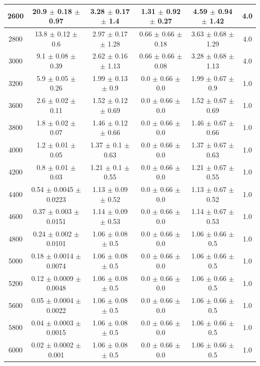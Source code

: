 \begin{table}[htp]
{\begin{tabular}{|c|c|c|c|c|c|}
			2600 & 20.9 $\pm$ 0.18 $\pm$ 0.97 & 3.28 $\pm$ 0.17 $\pm$ 1.4 & 1.31 $\pm$ 0.92 $\pm$ 0.27 & 4.59 $\pm$ 0.94 $\pm$ 1.42 & 4.0     \\ \hline
			2800 & 13.8 $\pm$ 0.12 $\pm$ 0.6 & 2.97 $\pm$ 0.17 $\pm$ 1.28 & 0.66 $\pm$ 0.66 $\pm$ 0.18 & 3.63 $\pm$ 0.68 $\pm$ 1.29 & 4.0     \\ \hline
			3000 & 9.1 $\pm$ 0.08 $\pm$ 0.39 & 2.62 $\pm$ 0.16 $\pm$ 1.13 & 0.66 $\pm$ 0.66 $\pm$ 0.08 & 3.28 $\pm$ 0.68 $\pm$ 1.13 & 4.0     \\ \hline
			3200 & 5.9 $\pm$ 0.05 $\pm$ 0.26 & 1.99 $\pm$ 0.13 $\pm$ 0.9 & 0.0 $\pm$ 0.66 $\pm$ 0.0 & 1.99 $\pm$ 0.67 $\pm$ 0.9 & 1.0     \\ \hline
			3600 & 2.6 $\pm$ 0.02 $\pm$ 0.11 & 1.52 $\pm$ 0.12 $\pm$ 0.69 & 0.0 $\pm$ 0.66 $\pm$ 0.0 & 1.52 $\pm$ 0.67 $\pm$ 0.69 & 1.0     \\ \hline
			3800 & 1.8 $\pm$ 0.02 $\pm$ 0.07 & 1.46 $\pm$ 0.12 $\pm$ 0.66 & 0.0 $\pm$ 0.66 $\pm$ 0.0 & 1.46 $\pm$ 0.67 $\pm$ 0.66 & 1.0     \\ \hline
			4000 & 1.2 $\pm$ 0.01 $\pm$ 0.05 & 1.37 $\pm$ 0.1 $\pm$ 0.63 & 0.0 $\pm$ 0.66 $\pm$ 0.0 & 1.37 $\pm$ 0.67 $\pm$ 0.63 & 1.0     \\ \hline
			4200 & 0.8 $\pm$ 0.01 $\pm$ 0.03 & 1.21 $\pm$ 0.1 $\pm$ 0.55 & 0.0 $\pm$ 0.66 $\pm$ 0.0 & 1.21 $\pm$ 0.67 $\pm$ 0.55 & 1.0     \\ \hline
			4400 & 0.54 $\pm$ 0.0045 $\pm$ 0.0223 & 1.13 $\pm$ 0.09 $\pm$ 0.52 & 0.0 $\pm$ 0.66 $\pm$ 0.0 & 1.13 $\pm$ 0.67 $\pm$ 0.52 & 1.0     \\ \hline
			4600 & 0.37 $\pm$ 0.003 $\pm$ 0.0151 & 1.14 $\pm$ 0.09 $\pm$ 0.53 & 0.0 $\pm$ 0.66 $\pm$ 0.0 & 1.14 $\pm$ 0.67 $\pm$ 0.53 & 1.0     \\ \hline
			4800 & 0.24 $\pm$ 0.002 $\pm$ 0.0101 & 1.06 $\pm$ 0.08 $\pm$ 0.5 & 0.0 $\pm$ 0.66 $\pm$ 0.0 & 1.06 $\pm$ 0.66 $\pm$ 0.5 & 1.0     \\ \hline
			5000 & 0.18 $\pm$ 0.0014 $\pm$ 0.0074 & 1.06 $\pm$ 0.08 $\pm$ 0.5 & 0.0 $\pm$ 0.66 $\pm$ 0.0 & 1.06 $\pm$ 0.66 $\pm$ 0.5 & 1.0     \\ \hline
			5200 & 0.12 $\pm$ 0.0009 $\pm$ 0.0048 & 1.06 $\pm$ 0.08 $\pm$ 0.5 & 0.0 $\pm$ 0.66 $\pm$ 0.0 & 1.06 $\pm$ 0.66 $\pm$ 0.5 & 1.0     \\ \hline
			5600 & 0.05 $\pm$ 0.0004 $\pm$ 0.0022 & 1.06 $\pm$ 0.08 $\pm$ 0.5 & 0.0 $\pm$ 0.66 $\pm$ 0.0 & 1.06 $\pm$ 0.66 $\pm$ 0.5 & 1.0     \\ \hline
			5800 & 0.04 $\pm$ 0.0003 $\pm$ 0.0015 & 1.06 $\pm$ 0.08 $\pm$ 0.5 & 0.0 $\pm$ 0.66 $\pm$ 0.0 & 1.06 $\pm$ 0.66 $\pm$ 0.5 & 1.0     \\ \hline
			6000 & 0.02 $\pm$ 0.0002 $\pm$ 0.001 & 1.06 $\pm$ 0.08 $\pm$ 0.5 & 0.0 $\pm$ 0.66 $\pm$ 0.0 & 1.06 $\pm$ 0.66 $\pm$ 0.5 & 1.0     \\ \hline
	\end{tabular}}
\end{table}

